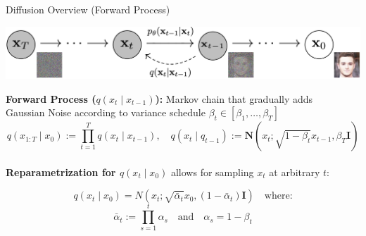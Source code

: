 \documentclass{beamer}
\begin{document}
\begin{frame}[t]{Diffusion Overview (Forward Process)}
    \begin{center}
        \includegraphics[width=.9\textwidth]{./img/img_diffusion.png}
    \end{center}
    \textbf{Forward Process ($q(x_t \mid x_{t-1})$):} Markov chain that gradually adds \\ \hspace{1em} Gaussian Noise according to variance schedule $\beta_t \in [\beta_1, \dots, \beta_T]$
    \[
    q(x_{1:T} \mid x_0) := \prod_{t=1}^{T} q(x_t \mid x_{t-1}),\hspace{1em} q(x_t \mid q_{t-1}) := \mathbf{N}(x_t; \sqrt{1 - \beta_t} x_{t-1}, \beta_T \mathbf{I})
    \] \\ \pause
    \textbf{Reparametrization for $q(x_t \mid x_0)$} allows for sampling $x_t$ at arbitrary $t$:

    \[
    q(x_t \mid x_0) = N(x_t; \sqrt{\bar{\alpha}_t}x_0, (1-\bar{\alpha}_t)\mathbf{I}) \hspace{1em} \text{where:}
    \]
    \[
    \bar{\alpha}_t := \prod_{s=1}^t \alpha_s \hspace{1em} \text{and}\hspace{1em} \alpha_s = 1 - \beta_t
    \]
\end{frame}
\end{document}
